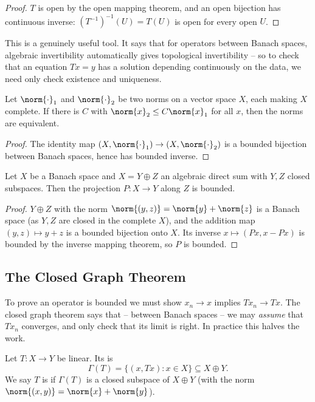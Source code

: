 \documentclass[a4paper]{scrartcl}
\begin{document}
\begin{proof}
	$T$ is open by the open mapping theorem, and an open bijection has continuous inverse: $(T^{-1})^{-1}(U) = T(U)$ is open for every open $U$.
\end{proof}

This is a genuinely useful tool. It says that for operators between Banach spaces, algebraic invertibility automatically gives topological invertibility -- so to check that an equation $Tx = y$ has a solution depending continuously on the data, we need only check existence and uniqueness.

\begin{corollary}
	Let $\norm{\cdot}_1$ and $\norm{\cdot}_2$ be two norms on a vector space $X$, each making $X$ complete. If there is $C$ with $\norm{x}_2 \leq C\norm{x}_1$ for all $x$, then the norms are equivalent.
\end{corollary}

\begin{proof}
	The identity map $(X, \norm{\cdot}_1) \to (X, \norm{\cdot}_2)$ is a bounded bijection between Banach spaces, hence has bounded inverse.
\end{proof}

\begin{corollary}
	Let $X$ be a Banach space and $X = Y \oplus Z$ an algebraic direct sum with $Y, Z$ closed subspaces. Then the projection $P : X \to Y$ along $Z$ is bounded.
\end{corollary}

\begin{proof}
	$Y \oplus Z$ with the norm $\norm{(y,z)} = \norm{y} + \norm{z}$ is a Banach space (as $Y, Z$ are closed in the complete $X$), and the addition map $(y,z) \mapsto y+z$ is a bounded bijection onto $X$. Its inverse $x \mapsto (Px, x - Px)$ is bounded by the inverse mapping theorem, so $P$ is bounded.
\end{proof}

\subsection{The Closed Graph Theorem}

To prove an operator is bounded we must show $x_n \to x$ implies $Tx_n \to Tx$. The closed graph theorem says that -- between Banach spaces -- we may \emph{assume} that $Tx_n$ converges, and only check that its limit is right. In practice this halves the work.

\begin{definition}[Graph]
	Let $T : X \to Y$ be linear. Its  is
	$$\Gamma(T) = \{ (x, Tx) : x \in X \} \subseteq X \oplus Y.$$
	We say $T$ is  if $\Gamma(T)$ is a closed subspace of $X \oplus Y$ (with the norm $\norm{(x,y)} = \norm{x} + \norm{y}$).
\end{definition}
\end{document}
